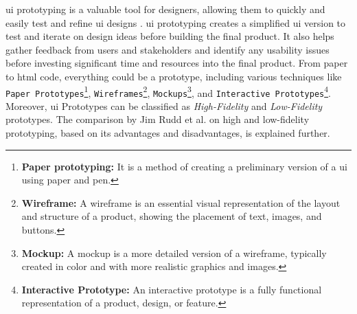\ac{ui} prototyping is a valuable tool for designers, allowing them to quickly and easily test and refine \ac{ui} designs \cite{article:prototyping:gould}.
\ac{ui} prototyping creates a simplified \ac{ui} version to test and iterate on design ideas before building the final product.
It also helps gather feedback from users and stakeholders \cite{misc:prorotypes:lauff} and identify any usability issues before investing significant time and resources into the final product.
From paper to \ac{html} code, everything could be a prototype, including various techniques like \texttt{Paper Prototypes}\footnote{\textbf{Paper prototyping:} It is a method of creating a preliminary version of a \ac{ui} using paper and pen.}, \texttt{Wireframes}\footnote{\textbf{Wireframe:} A wireframe is an essential visual representation of the layout and structure of a product, showing the placement of text, images, and buttons.}, \texttt{Mockups}\footnote{\textbf{Mockup:} A mockup is a more detailed version of a wireframe, typically created in color and with more realistic graphics and images.}, and \texttt{Interactive Prototypes}\footnote{\textbf{Interactive Prototype:} An interactive prototype is a fully functional representation of a product, design, or feature.}.
Moreover, \ac{ui} Prototypes can be classified as \textit{High-Fidelity} and \textit{Low-Fidelity} prototypes.
The comparison by Jim Rudd et al. \cite{article:prototyping:highlowfidelity} on high and low-fidelity prototyping, based on its advantages and disadvantages, is explained further.

